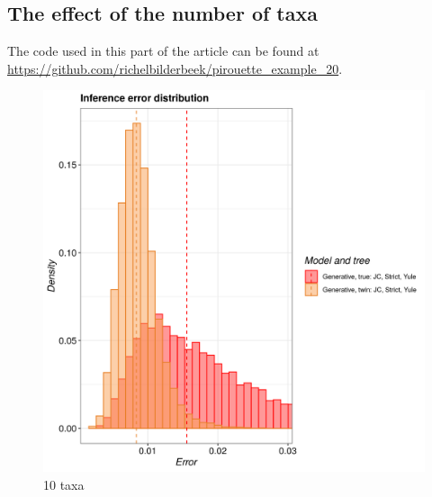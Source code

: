



\subsection{The effect of the number of taxa}

The code used in this part of the article can be found at 
\url{https://github.com/richelbilderbeek/pirouette_example_20}. 

\begin{figure}[H]
  \includegraphics[width=\textwidth]{pirouette_example_20/example_20_314/errors.png}
  \caption{10 taxa}
\end{figure}

